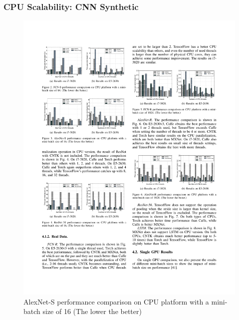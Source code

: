 \begin{frame}
	\MyLogo
	\frametitle{CPU Scalability: CNN Synthetic}  

	\begin{figure}[htbp] 
		\includegraphics[width=\linewidth]{figures/AlexNet-S1.pdf} 
		\caption{AlexNet-S performance comparison on CPU platform with a mini-batch size of 16 (The lower the better)}
	\end{figure}	
\end{frame}


